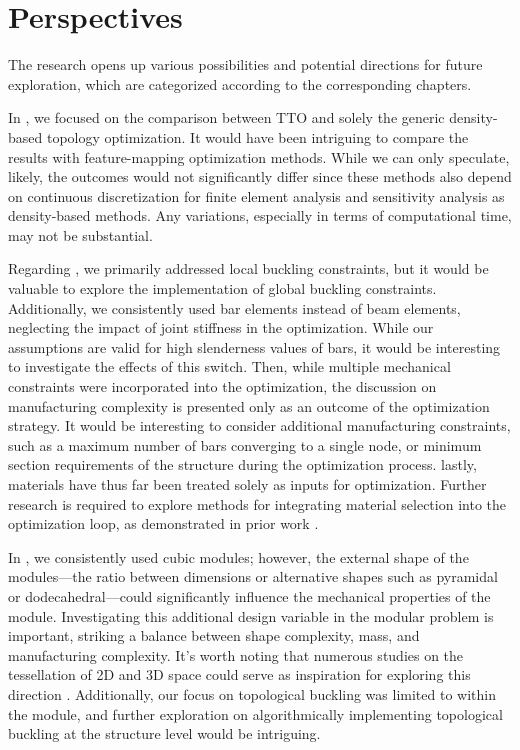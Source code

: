 \section*{Perspectives}
The research opens up various possibilities and potential directions for future exploration, which are categorized according to the corresponding chapters.

In , we focused on the comparison between TTO and solely the generic density-based topology optimization. It would have been intriguing to compare the results with feature-mapping optimization methods. While we can only speculate, likely, the outcomes would not significantly differ since these methods also depend on continuous discretization for finite element analysis and sensitivity analysis as density-based methods. Any variations, especially in terms of computational time, may not be substantial.

Regarding , we primarily addressed local buckling constraints, but it would be valuable to explore the implementation of global buckling constraints. Additionally, we consistently used bar elements instead of beam elements, neglecting the impact of joint stiffness in the optimization. While our assumptions are valid for high slenderness values of bars, it would be interesting to investigate the effects of this switch. Then, while multiple mechanical constraints were incorporated into the optimization, the discussion on manufacturing complexity is presented only as an outcome of the optimization strategy. It would be interesting to consider additional manufacturing constraints, such as a maximum number of bars converging to a single node, or minimum section requirements of the structure during the optimization process. lastly, materials have thus far been treated solely as inputs for optimization. Further research is required to explore methods for integrating material selection into the optimization loop, as demonstrated in prior work .

In , we consistently used cubic modules; however, the external shape of the modules—\ie the ratio between dimensions or alternative shapes such as pyramidal or dodecahedral—could significantly influence the mechanical properties of the module. Investigating this additional design variable in the modular problem is important, striking a balance between shape complexity, mass, and manufacturing complexity. It's worth noting that numerous studies on the tessellation of 2D and 3D space could serve as inspiration for exploring this direction . Additionally, our focus on topological buckling was limited to within the module, and further exploration on algorithmically implementing topological buckling at the structure level would be intriguing.

